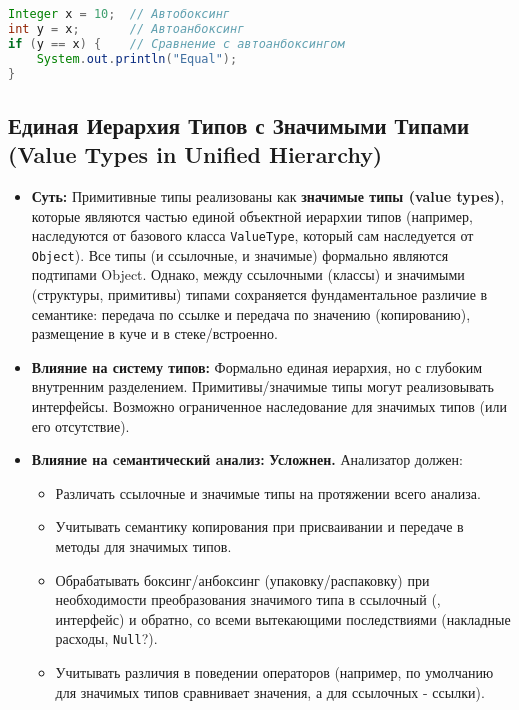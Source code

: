 \newpage

\begin{lstlisting}[language=java,title=Пример в Java]
Integer x = 10;  // Автобоксинг
int y = x;       // Автоанбоксинг
if (y == x) {    // Сравнение с автоанбоксингом
    System.out.println("Equal");
}
\end{lstlisting}

\subsection{Единая Иерархия Типов с Значимыми Типами (Value Types in Unified Hierarchy)}

\begin{itemize}[leftmargin=*, label={--}]
    \item \textbf{Суть:} Примитивные типы реализованы как \textbf{значимые типы (value types)}, которые являются частью единой объектной иерархии типов (например, наследуются от базового класса \texttt{ValueType}, который сам наследуется от \texttt{Object}). Все типы (и ссылочные, и значимые) формально являются подтипами Object. Однако, между ссылочными (классы) и значимыми (структуры, примитивы) типами сохраняется фундаментальное различие в семантике: передача по ссылке и передача по значению (копированию), размещение в куче и в стеке/встроенно.

    \item \textbf{Влияние на систему типов:} Формально единая иерархия, но с глубоким внутренним разделением. Примитивы/значимые типы могут реализовывать интерфейсы. Возможно ограниченное наследование для значимых типов (или его отсутствие).

    \item \textbf{Влияние на cемантический aнализ:}
    \textbf{Усложнен.}
    Анализатор должен:
    \begin{itemize}
        \item Различать ссылочные и значимые типы на протяжении всего анализа.
        \item Учитывать семантику копирования при присваивании и передаче в методы для значимых типов.
        \item Обрабатывать боксинг/анбоксинг (упаковку/распаковку) при необходимости преобразования значимого типа в ссылочный (, интерфейс) и обратно, со всеми вытекающими последствиями (накладные расходы, \texttt{Null}?).
        \item Учитывать различия в поведении операторов (например, \code{==} по умолчанию для значимых типов сравнивает значения, а для ссылочных - ссылки).
    \end{itemize}


\end{itemize}
